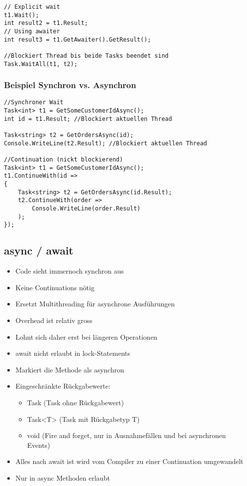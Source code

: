 \begin{multicols*}{2}
\begin{lstlisting}
// Explicit wait
t1.Wait();
int result2 = t1.Result;
// Using awaiter
int result3 = t1.GetAwaiter().GetResult();

//Blockiert Thread bis beide Tasks beendet sind
Task.WaitAll(t1, t2);
\end{lstlisting}
\subsubsection{Beispiel Synchron vs. Asynchron}
\begin{lstlisting}
//Synchroner Wait
Task<int> t1 = GetSomeCustomerIdAsync();
int id = t1.Result; //Blockiert aktuellen Thread
    
Task<string> t2 = GetOrdersAsync(id);
Console.WriteLine(t2.Result); //Blockiert aktuellen Thread

//Continuation (nickt blockierend)
Task<int> t1 = GetSomeCustomerIdAsync();
t1.ContinueWith(id =>
{
    Task<string> t2 = GetOrdersAsync(id.Result);
    t2.ContinueWith(order =>
        Console.WriteLine(order.Result)
    );
});
\end{lstlisting}

\subsection{async / await}
\begin{multicols*}{2}
\begin{itemize}
    \item Code sieht immernoch synchron aus
    \item Keine Continuations nötig
    \item Ersetzt Multithreading für asynchrone Ausführungen
\end{itemize}
\columnbreak
{}
\begin{itemize}
    \item Overhead ist relativ gross
    \item Lohnt sich daher erst bei längeren Operationen
    \item await nicht erlaubt in lock-Statements
\end{itemize}
\end{multicols*}

\begin{itemize}
    \item Markiert die Methode als asynchron
    \item Eingeschränkte Rückgabewerte:
    \begin{itemize}
        \item Task (Task ohne Rückgabewert)
        \item Task<T> (Task mit Rückgabetyp T)
        \item void (Fire and forget, nur in Ausnahmefällen und bei asynchronen Events)
    \end{itemize}
\end{itemize}
\begin{itemize}
    \item Alles nach await ist wird vom Compiler zu einer Continuation umgewandelt
    \item Nur in async Methoden erlaubt
\end{itemize}

\end{multicols*}
